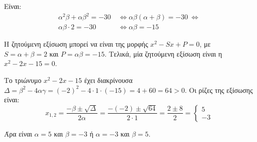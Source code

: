 
\begin{alist}
\item Είναι:
\begin{align*}
\alpha^2\beta + \alpha\beta^2 = -30 \ &\Leftrightarrow
\alpha\beta(\alpha + \beta) = -30 \ \Leftrightarrow \\
\alpha\beta \cdot 2 = -30 \ &\Leftrightarrow
\alpha\beta = -15
\end{align*}

\item Η ζητούμενη εξίσωση μπορεί να είναι της μορφής $x^2 - Sx + P = 0$, με $S = \alpha + \beta = 2$ και $P = \alpha\beta = -15$.
Τελικά, μία ζητούμενη εξίσωση είναι η $x^2 - 2x - 15 = 0$.

Το τριώνυμο $x^2 - 2x - 15$ έχει διακρίνουσα $\Delta = \beta^2 - 4\alpha\gamma = (-2)^2 - 4 \cdot 1 \cdot (-15) = 4 + 60 = 64 > 0$.
Οι ρίζες της εξίσωσης είναι:
\[x_{1,2} = \dfrac{-\beta \pm \sqrt{\Delta}}{2\alpha} = \dfrac{-(-2) \pm \sqrt{64}}{2 \cdot 1} = \dfrac{2 \pm 8}{2} = \begin{cases} 5 \\ -3 \end{cases}\]

Άρα είναι $\alpha = 5$ και $\beta = -3$ ή $\alpha = -3$ και $\beta = 5$.
\end{alist}


